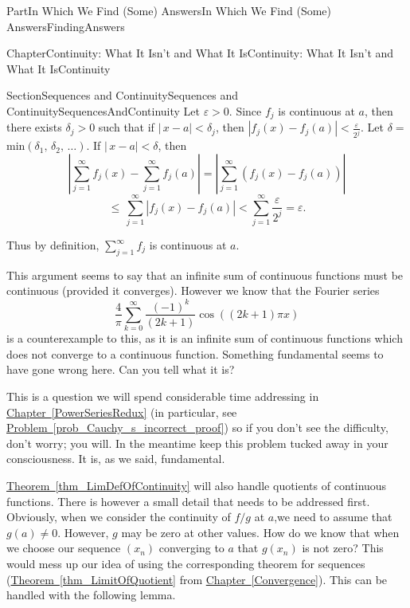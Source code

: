 \documentclass[oneside,10pt,]{book}
\newcommand{\xreffont}{\relax}
\numberwithin{equation}{part}
\newcommand{\eps}{\varepsilon}
\newcommand{\lt}{<}
\begin{document}
\begin{partptx}{Part}{In Which We Find (Some) Answers}{}{In Which We Find (Some) Answers}{}{}{FindingAnswers}
\begin{chapterptx}{Chapter}{Continuity: What It Isn't and What It Is}{}{Continuity: What It Isn't and What It Is}{}{}{Continuity}
\begin{sectionptx}{Section}{Sequences and Continuity}{}{Sequences and Continuity}{}{}{SequencesAndContinuity}
Let \(\eps>0\).  Since \(f_j\) is continuous at \(a\), then there exists \(\delta_j>0\) such that if \(|\,x-a|\lt
\delta_j\), then \(|f_j(x)-f_j(a)|\lt \frac{\eps}{2^j}\). Let \(\delta=\)min\(\left(\delta_1,\,\delta_2,\,\ldots\right)\). If \(|\,x-a|\lt \delta\), then%
\begin{equation*}
\left|\sum_{j=1}^\infty f_j(x)-\sum_{j=1}^\infty f_j(a)\right|=\left|\sum_{j=1}^\infty\left(f_j(x)-f_j(a)\right)\right|
\end{equation*}
%
\begin{equation*}
\leq\,\sum_{j=1}^\infty|f_j(x)-f_j(a)|\lt \sum_{j=1}^\infty\frac{ \eps}{2^j}=\eps\text{.}
\end{equation*}
%
\par
Thus by definition, \(\sum_{j=1}^\infty f_j\) is continuous at \(a\).%
\par
This argument seems to say that an infinite sum of continuous functions must be continuous (provided it converges).  However we know that the Fourier series%
\begin{equation*}
\frac{4}{\pi}\sum_{k=0}^\infty\frac{\left(-1\right)^k}{\left(2k+1\right)}\cos\left(\left(2k+1\right)\pi x\right)
\end{equation*}
is a counterexample to this, as it is an infinite sum of continuous functions which does not converge to a continuous function.  Something fundamental seems to have gone wrong here. Can you tell what it is?%
\par
This is a question we will spend considerable time addressing in \hyperref[PowerSeriesRedux]{Chapter~{\xreffont\ref{PowerSeriesRedux}}} (in particular, see \hyperref[prob_Cauchy_s_incorrect_proof]{Problem~{\xreffont\ref{prob_Cauchy_s_incorrect_proof}}}) so if you don't see the difficulty, don't worry; you will.  In the meantime keep this problem tucked away in your consciousness. It is, as we said, fundamental.%
\par
\hyperref[thm_LimDefOfContinuity]{Theorem~{\xreffont\ref{thm_LimDefOfContinuity}}} will also handle quotients of continuous functions.  There is however a small detail that needs to be addressed first.  Obviously, when we consider the continuity of \(f/g\) at \(a\),\(\)we need to assume that \(g(a)\neq 0\).  However, \(g\) may be zero at other values.  How do we know that when we choose our sequence \(\left(x_n\right)\) converging to \(a\) that \(g(x_n)\) is not zero?  This would mess up our idea of using the corresponding theorem for sequences (\hyperref[thm_LimitOfQuotient]{Theorem~{\xreffont\ref{thm_LimitOfQuotient}}} from \hyperref[Convergence]{Chapter~{\xreffont\ref{Convergence}}}).  This can be handled with the following lemma.%

\end{sectionptx}
\end{chapterptx}
\end{partptx}
\end{document}
